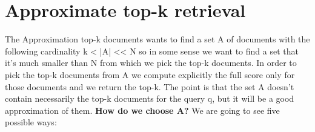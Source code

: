  \section{Approximate top-k retrieval}
The Approximation top-k documents wants to find a set A of documents with the following cardinality k < |A| << N so in some sense we want to find a set that it's much smaller than N from which we pick the top-k documents.\newline
In order to pick the top-k documents from A we compute explicitly the full score only for those documents and we return the top-k.\newline
The point is that the set A doesn't contain necessarily the top-k documents for the query q, but it will be a good approximation of them.\newline
\textbf{How do we choose A?} We are going to see five possible ways:
